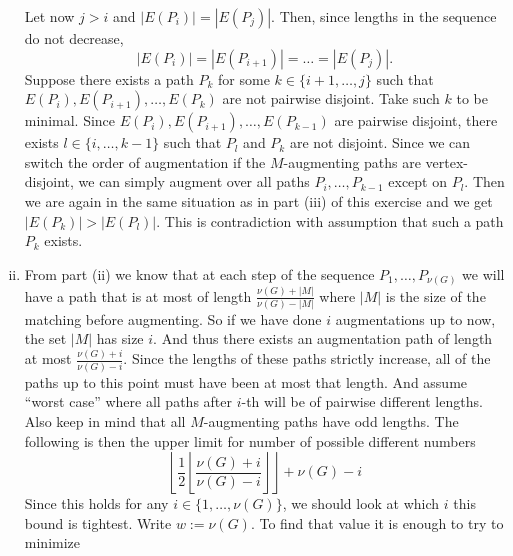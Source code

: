 \begin{exercise}{2}
\begin{enumerate}[i)]
{                Let now $j > i$ and $|E(P_i)| = |E(P_j)|$. Then, since
                lengths in the sequence do not decrease,
                \begin{equation*}
                    |E(P_i)| = |E(P_{i+1})| = \dots = |E(P_j)|.
                \end{equation*}
                Suppose there exists a path $P_k$ for some $k \in  \{i + 1,
                \dots, j\}$ such that $E(P_i), E(P_{i+1}), \dots, E(P_k)$ are
                not pairwise disjoint. Take such $k$ to be minimal. Since
                $E(P_i), E(P_{i+1}), \dots, E(P_{k-1})$ are pairwise disjoint,
                there exists $l \in \{i, \dots, k-1\}$ such that $P_l$ and $P_k$
                are not disjoint. Since we can switch the order of augmentation
                if the $M$-augmenting paths are vertex-disjoint, we can simply
                augment over all paths $P_i, \dots, P_{k-1}$ except on $P_l$.
                Then we are again in the same situation as in part (iii) of this
                exercise and we get $|E(P_k)| > |E(P_l)|$. This is contradiction
                with assumption that such a path $P_k$ exists.
            }
        \item{From part (ii) we know that at each step of the sequence $P_1,
            \dots, P_{\nu(G)}$ we will have a path that is at most of length
            $\frac{\nu(G) + |M|}{\nu(G) - |M|}$ where $|M|$ is the size of the
            matching before augmenting. So if we have done $i$ augmentations up
            to now, the set $|M|$ has size $i$. And thus there exists an
            augmentation path of length at most $\frac{\nu(G) + i}{\nu(G) - i}$.
            Since the lengths of these paths strictly increase, all of the paths
            up to this point must have been at most that length. And assume
            ``worst case'' where all paths after $i$-th will be of pairwise
            different lengths. Also keep in mind that all $M$-augmenting paths
            have odd lengths. The following is then the upper limit for number
            of possible different numbers
            \begin{equation*}
                \left\lfloor \frac{1}{2} \left\lfloor \frac{\nu(G) + i}{\nu(G) -
                i} \right\rfloor \right\rfloor + \nu(G) - i
            \end{equation*}
            Since this holds for any $i \in \{1, \dots, \nu(G)\}$, we should
            look at which $i$ this bound is tightest.
            Write $w := \nu(G)$.
            To find that value it is enough to try to minimize
}
\end{enumerate}
\end{exercise}
